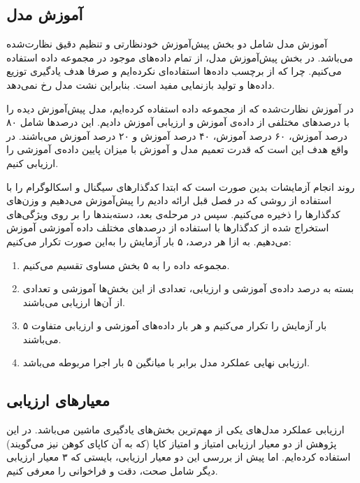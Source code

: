 \subsection{آموزش مدل}

آموزش مدل شامل دو بخش پیش‌آموزش خودنظارتی و تنظیم دقیق نظارت‌شده می‌باشد. در بخش پیش‌آموزش مدل، از تمام داده‌های موجود در مجموعه داده استفاده می‌کنیم. چرا که از برچسب داده‌ها استفاده‌ای نکرده‌ایم و صرفا هدف یادگیری توزیع داده‌ها و تولید بازنمایی مفید است. بنابراین
نشت مدل
رخ نمی‌دهد.

در آموزش نظارت‌شده که از مجموعه داده  استفاده کرده‌ایم، مدل پیش‌آموزش دیده را با درصدهای مختلفی از داده‌ی آموزش و ارزیابی آموزش دادیم. این درصدها شامل ۸۰ درصد آموزش، ۶۰ درصد آموزش، ۴۰ درصد آموزش و ۲۰ درصد آموزش می‌باشند. در واقع هدف این است که قدرت تعمیم مدل و آموزش با میزان پایین داده‌ی آموزشی را ارزیابی کنیم.

روند انجام آزمایشات بدین صورت است که ابتدا کدگذارهای سیگنال و اسکالوگرام را با استفاده از روشی که در فصل قبل ارائه دادیم را پیش‌آموزش می‌دهیم و وزن‌های 
کدگذارها را ذخیره می‌کنیم. سپس در مرحله‌ی بعد، دسته‌بندها را بر روی ویژگی‌های استخراج شده از کدگذارها با استفاده از درصدهای مختلف داده آموزشی آموزش می‌دهیم. به ازا هر درصد، ۵ بار آزمایش را به‌این صورت تکرار می‌کنیم:
\begin{enumerate}
    \item مجموعه داده را به ۵ بخش مساوی تقسیم می‌کنیم.
    \item بسته به درصد داده‌ی آموزشی و ارزیابی، تعدادی از این بخش‌ها آموزشی و تعدادی از آن‌ها ارزیابی می‌باشند.
    \item ۵ بار آزمایش را تکرار می‌کنیم و هر بار داده‌های آموزشی و ارزیابی متفاوت می‌باشند.
    \item ارزیابی نهایی عملکرد مدل برابر با میانگین ۵ بار اجرا مربوطه می‌باشد.
\end{enumerate}

\subsection{معیارهای ارزیابی}

ارزیابی عملکرد مدل‌های یکی از مهم‌ترین بخش‌های یادگیری ماشین می‌باشد. در این پژوهش از دو معیار ارزیابی امتیاز 
و امتیاز کاپا
(که به آن کاپای کوهن نیز می‌گویند) استفاده کرده‌ایم. اما پیش از بررسی این دو معیار ارزیابی، بایستی که ۳ معیار ارزیابی دیگر شامل صحت، دقت و فراخوانی را معرفی کنیم.

